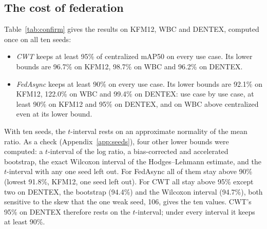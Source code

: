 \documentclass[pdflatex,sn-mathphys-num]{sn-jnl}
\begin{document}
\subsection{The cost of federation}\label{sec:res-cost-fed}\label{sec:res-confirm}
Table~\ref{tab:confirm} gives the results on KFM12, WBC and DENTEX, computed once on all ten seeds:
\begin{itemize}
\item \emph{CWT} keeps at least 95\% of centralized mAP50 on every use case. Its lower bounds are 96.7\% on KFM12, 98.7\% on WBC and 96.2\% on DENTEX.
\item \emph{FedAsync} keeps at least 90\% on every use case. Its lower bounds are 92.1\% on KFM12, 122.0\% on WBC and 99.4\% on DENTEX: use case by use case, at least 90\% on KFM12 and 95\% on DENTEX, and on WBC above centralized even at its lower bound.
\end{itemize}
With ten seeds, the $t$-interval rests on an approximate normality of the mean ratio. As a check (Appendix~\ref{app:seeds}), four other lower bounds were computed: a $t$-interval of the log ratio, a bias-corrected and accelerated bootstrap, the exact Wilcoxon interval of the Hodges--Lehmann estimate, and the $t$-interval with any one seed left out. For FedAsync all of them stay above 90\% (lowest 91.8\%, KFM12, one seed left out). For CWT all stay above 95\% except two on DENTEX, the bootstrap (94.4\%) and the Wilcoxon interval (94.7\%), both sensitive to the skew that the one weak seed, 106, gives the ten values. CWT's 95\% on DENTEX therefore rests on the $t$-interval; under every interval it keeps at least 90\%.
\end{document}
